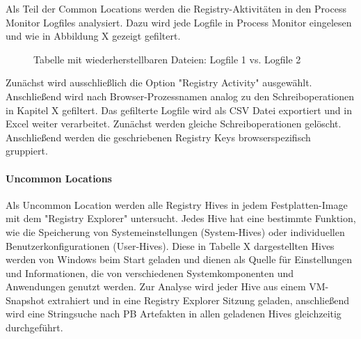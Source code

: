 Als Teil der Common Locations werden die Registry-Aktivitäten in den Process Monitor Logfiles analysiert.
Dazu wird jede Logfile in Process Monitor eingelesen und wie in Abbildung X gezeigt gefiltert.
\begin{figure}[h!]
	\centerline{}
	\caption{Tabelle mit wiederherstellbaren Dateien: Logfile 1 vs. Logfile 2}
\end{figure}
Zunächst wird ausschließlich die Option "Registry Activity" ausgewählt.
Anschließend wird nach Browser-Prozessnamen analog zu den Schreiboperationen in Kapitel X gefiltert.
Das gefilterte Logfile wird als CSV Datei exportiert und in Excel weiter verarbeitet.
Zunächst werden gleiche Schreiboperationen gelöscht.
Anschließend werden die geschriebenen Registry Keys browserspezifisch gruppiert.
	
\paragraph*{Uncommon Locations}
Als Uncommon Location werden alle Registry Hives in jedem Festplatten-Image mit dem "Registry Explorer" untersucht.
Jedes Hive hat eine bestimmte Funktion, wie die Speicherung von Systemeinstellungen (System-Hives) oder individuellen Benutzerkonfigurationen (User-Hives). Diese in Tabelle X dargestellten Hives werden von Windows beim Start geladen und dienen als Quelle für Einstellungen und Informationen, die von verschiedenen Systemkomponenten und Anwendungen genutzt werden.	
Zur Analyse wird jeder Hive aus einem VM-Snapshot extrahiert und in eine Registry Explorer Sitzung geladen, anschließend wird eine Stringsuche nach PB Artefakten in allen geladenen Hives gleichzeitig durchgeführt.

